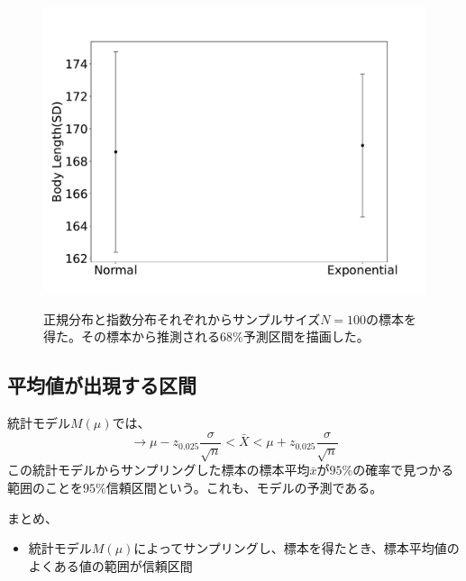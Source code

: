 \begin{figure}
    \begin{center}
        \includegraphics[width=15cm]{./image/12_/model_predict_SD.pdf}
        \label{fig:model_predict_SD}
        \caption{正規分布と指数分布それぞれからサンプルサイズ$N=100$の標本を得た。その標本から推測される$68\%$予測区間を描画した。}
      \end{center}
    \end{figure}

    

\subsection{平均値が出現する区間}
統計モデル$M(\mu)$では、
\begin{equation*}
    \rightarrow  \mu - z_{0.025} \frac{\sigma}{\sqrt{n}} < \bar{X} < \mu + z_{0.025} \frac{\sigma}{\sqrt{n}}
\end{equation*}
この統計モデルからサンプリングした標本の標本平均$\bar{x}$が$95\%$の確率で見つかる範囲のことを$95\%$信頼区間という。これも、モデルの予測である。



\begin{framed}
    まとめ、
    \begin{itemize}
        \item 統計モデル$M(\mu)$によってサンプリングし、標本を得たとき、標本平均値のよくある値の範囲が信頼区間
    \end{itemize}
    \end{framed}
\fi


